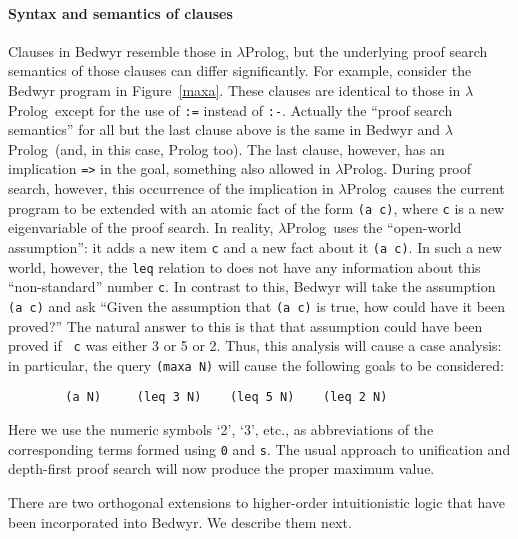 \documentclass{article}
\newcommand{\lp}{$\lambda$Prolog}
\begin{document}
\paragraph{Syntax and semantics of clauses}
Clauses in Bedwyr resemble those in \lp, but the underlying proof
search semantics of those clauses can differ significantly.  For example,
consider the Bedwyr program in Figure~\ref{maxa}.  These clauses are
identical to those in \lp\ except for the use of \verb+:=+ instead of
\verb+:-+.  Actually the ``proof search semantics'' for all but the
last clause above is the same in Bedwyr and \lp\ (and, in this case,
Prolog too).  The last clause, however, has an implication \verb+=>+
in the goal, something also allowed in \lp.  During proof search,
however, this occurrence of the implication in \lp\ causes the current
program to be extended with an atomic fact of the form \verb+(a c)+,
where {\tt c} is a new eigenvariable of the proof search.  In reality,
\lp\ uses the ``open-world assumption'': it adds a new item {\tt c}
and a new fact about it {\tt (a c)}.  In such a new world, however, the 
{\tt leq} relation to does not have any information about this
``non-standard'' number {\tt c}.  In contrast to this, Bedwyr will
take the assumption  {\tt (a c)} and ask ``Given the assumption that 
{\tt (a c)} is true, how could have it been proved?''  The natural
answer to this is that that assumption could have been proved if {\tt
c} was either 3 or 5 or 2.  Thus, this analysis will cause a case
analysis: in particular, the query {\tt (maxa N)} will cause the
following goals to be considered:
\begin{verbatim}
        (a N)     (leq 3 N)    (leq 5 N)    (leq 2 N)
\end{verbatim}
Here we use the numeric symbols `2', `3', etc., as abbreviations of
the corresponding terms formed using \texttt{0} and \texttt{s}.
The usual approach to unification and depth-first proof search will
now produce the proper maximum value.

\bigskip
There are two orthogonal extensions to higher-order intuitionistic
logic that have been incorporated into Bedwyr.   We describe them next.
\end{document}
